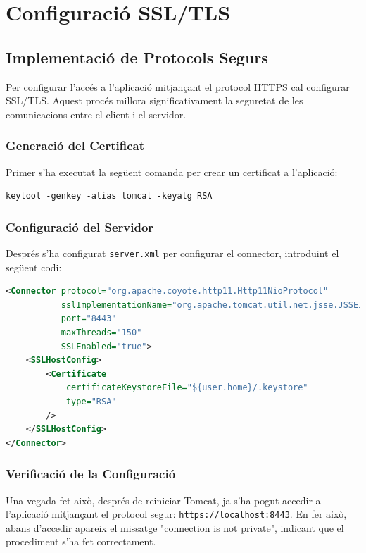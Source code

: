 \documentclass[12pt,a4paper]{article}
\begin{document}
\section{Configuració SSL/TLS}

\subsection{Implementació de Protocols Segurs}

Per configurar l'accés a l'aplicació mitjançant el protocol HTTPS cal configurar SSL/TLS. Aquest procés millora significativament la seguretat de les comunicacions entre el client i el servidor.

\subsubsection{Generació del Certificat}

Primer s'ha executat la següent comanda per crear un certificat a l'aplicació:

\begin{lstlisting}[style=shellstyle,caption=Generació de certificat SSL]
keytool -genkey -alias tomcat -keyalg RSA
\end{lstlisting}

\subsubsection{Configuració del Servidor}

Després s'ha configurat \texttt{server.xml} per configurar el connector, introduint el següent codi:

\begin{lstlisting}[language=XML,caption=Configuració SSL en server.xml]
<Connector protocol="org.apache.coyote.http11.Http11NioProtocol"
           sslImplementationName="org.apache.tomcat.util.net.jsse.JSSEImplementation"
           port="8443"
           maxThreads="150"
           SSLEnabled="true">
    <SSLHostConfig>
        <Certificate
            certificateKeystoreFile="${user.home}/.keystore"
            type="RSA"
        />
    </SSLHostConfig>
</Connector>
\end{lstlisting}

\subsubsection{Verificació de la Configuració}

Una vegada fet això, després de reiniciar Tomcat, ja s'ha pogut accedir a l'aplicació mitjançant el protocol segur: \texttt{https://localhost:8443}. En fer això, abans d'accedir apareix el missatge "connection is not private", indicant que el procediment s'ha fet correctament.
\end{document}
